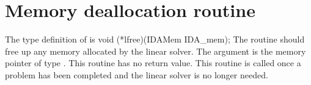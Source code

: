 
\section{Memory deallocation routine}
The type definition of  is
{
  void (*lfree)(IDAMem IDA\_mem);
}
{
  The routine  should free up any memory allocated by the linear
  solver.
}
{
  The argument  is the {\idas} memory pointer of type .
}
{
  This routine has no return value.
}
{
  This routine is called once a problem has been completed and the 
  linear solver is no longer needed.
}